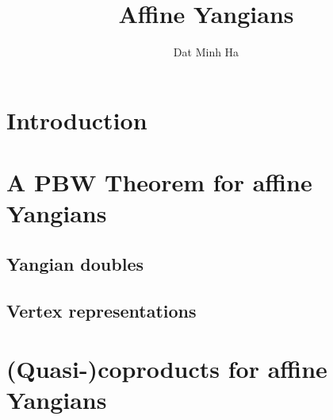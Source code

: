 

\setcounter{section}{-1}





    \title{Affine Yangians}
    
    \author{Dat Minh Ha}
    \maketitle
    
    \begin{abstract}
    
    \end{abstract}
    
    {
    \hypersetup{} 
    \tableofcontents %
    }

    \section{Introduction}

    \section{A PBW Theorem for affine Yangians}
        \subsection{Yangian doubles}

        \subsection{Vertex representations}

    \section{(Quasi-)coproducts for affine Yangians}
    
    \printbibliography

